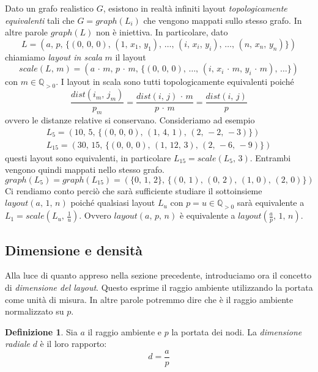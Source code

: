 \documentclass[a4paper,11pt]{article}
\theoremstyle{definition}
\newtheorem{definition}{Definizione}
\begin{document}
Dato un grafo realistico $G$, esistono in realtà infiniti layout \emph{topologicamente equivalenti} tali che $G = graph(L_i)$ che vengono mappati sullo stesso grafo. In altre parole $graph(L)$ non è iniettiva. In particolare, dato
\begin{equation*}
L = (a,\,p,\,\{(0,\,0,\,0),\,(1,\,x_1,\,y_1),\,\dots,\,(i,\,x_i,\,y_i),\,\dots,\,(n,\,x_n,\,y_n)\})
\end{equation*}
chiamiamo \emph{layout in scala} $m$ il layout
\begin{equation*}
scale(L,\,m) = (a\,\cdot\,m,\,p\,\cdot\,m,\,\{(0,\,0,\,0),\,\dots,\,(i,\,x_i\,\cdot\,m,\,y_i\,\cdot\,m),\,\dots\})
\end{equation*}
con $m \in \mathbb{Q}_{>0}$. I layout in scala sono tutti topologicamente equivalenti poiché
\begin{equation*}
\frac{dist(i_m,\,j_m)}{p_m} = \frac{dist(i,\,j)\,\cdot\,m}{p\,\cdot\,m} = \frac{dist(i,\,j)}{p}	
\end{equation*}
ovvero le distanze relative si conservano. Consideriamo ad esempio
\begin{align*}
L_5 = (10,\,5,\,\{(0,\,0,\,0),\,(1,\,4,\,1),\,(2,\,-2,\,-3)\})\\
L_{15} = (30,\,15,\,\{(0,\,0,\,0),\,(1,\,12,\,3),\,(2,\,-6,\,-9)\})
\end{align*}
questi layout sono equivalenti, in particolare $L_{15} = scale(L_5,\,3)$. Entrambi vengono quindi mappati nello stesso grafo.
\begin{equation*}
graph(L_5) = graph(L_{15}) = (\{0,\,1,\,2\},\,\{(0,\,1),\,(0,\,2),\,(1,\,0),\,(2,\,0)\})
\end{equation*}
Ci rendiamo conto perciò che sarà sufficiente studiare il sottoinsieme $layout(a,\,1,\,n)$ poiché qualsiasi layout $L_u$ con $p=u \in \mathbb{Q}_{>0}$ sarà equivalente a $L_1 = scale(L_u,\,\frac{1}{u})$. Ovvero $layout(a,\,p,\,n)$ è equivalente a $layout(\frac{a}{p},\,1,\,n)$.

\subsection{Dimensione e densità}

Alla luce di quanto appreso nella sezione precedente, introduciamo ora il concetto di \emph{dimensione del layout}. Questo esprime il raggio ambiente utilizzando la portata come unità di misura. In altre parole potremmo dire che è il raggio ambiente normalizzato su $p$.

\begin{definition}
Sia $a$ il raggio ambiente e $p$ la portata dei nodi. La \emph{dimensione radiale} $d$ è il loro rapporto:
\begin{equation*}
d = \frac{a}{p}
\end{equation*}
\end{definition}
\end{document}
